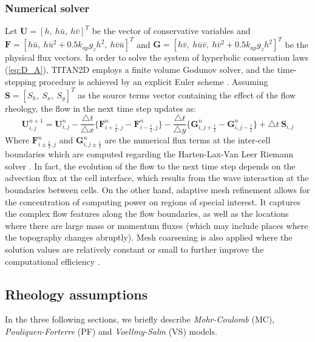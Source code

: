 \documentclass{article}
\begin{document}
\subsubsection{Numerical solver}\label{NumS}
Let $\textbf{U}=\left[h, \ h\bar{u}, \ h\bar{v}\right]^T$ be the vector of conservative variables and $\textbf{F}=\left[h\bar{u}, \ h\bar{u}^2+0.5 k_{ap} g_z h^2, \ h\bar{v}\bar{u}\right]^T$ and $\textbf{G}=\left[h\bar{v}, \ h\bar{u}\bar{v}, \ h\bar{v}^2+0.5 k_{ap} g_z h^2\right]^T$ be the physical flux vectors.
In order to solve the system of hyperbolic conservation laws (\ref{eq:D_A}), TITAN2D employs a finite volume Godunov solver, and the time-stepping procedure is achieved by an explicit Euler scheme \citep{Pitman2003a, Patra2005, Patra2006}. Assuming $\textbf{S}=\left[S_h, \ S_x, \ S_y\right]^T$ as the source terms vector containing the effect of the flow rheology, the flow in the next time step updates as:
\begin{equation}\label{integrator}
\textbf{U}_{i,j}^{n+1} = \textbf{U}_{i,j}^n - \frac{\bigtriangleup t}{\bigtriangleup x} \{\textbf{F}_{i+\frac{1}{2},j}^n - \textbf{F}_{i-\frac{1}{2},j}^n \} - \frac{\bigtriangleup t}{\bigtriangleup y} \{\textbf{G}_{i,j+\frac{1}{2}}^n - \textbf{G}_{i,j-\frac{1}{2}}^n \} + \bigtriangleup t \ \textbf{S}_{i,j}
\end{equation}
Where $\textbf{F}_{i\pm\frac{1}{2},j}^n$ and $\textbf{G}_{i,j\pm\frac{1}{2}}^n$ are the numerical flux terms at the inter-cell boundaries which are computed regarding the Harten-Lax-Van Leer Riemann solver \citep{Toro2013} . In fact, the evolution of the flow to the next time step depends on the advection flux at the cell interface, which results from the wave interaction at the boundaries between cells.
On the other hand, adaptive mesh refinement allows for the concentration of computing power on regions of special interest. It captures the complex flow features along the flow boundaries, as well as the locations where there are large mass or momentum fluxes (which may include places where the topography changes abruptly). Mesh coarsening is also applied where the solution values are relatively constant or small to further improve the computational efficiency \citep{Patra2005,Aghakhani2016}.

\subsection{Rheology assumptions}\label{subsec:Models}
In the three following sections, we briefly describe \emph{Mohr-Coulomb} (MC), \emph{Pouliquen-Forterre} (PF) and \emph{Voellmy-Salm} (VS) models.
\end{document}

